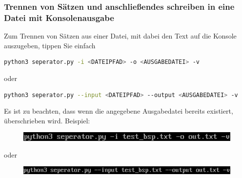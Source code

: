 \documentclass[12pt]{scrartcl}
\begin{document}
\subsubsection{Trennen von Sätzen und anschließendes schreiben in eine Datei mit Konsolenausgabe}
\label{sec:first-steps-extraction-file-with}
Zum Trennen von Sätzen aus einer Datei, mit dabei den Text auf die Konsole auszugeben, tippen Sie einfach
\begin{lstlisting}[language=bash]
python3 seperator.py -i <DATEIPFAD> -o <AUSGABEDATEI> -v
\end{lstlisting}
\begin{center}
oder
\end{center}
\begin{lstlisting}[language=bash] 
python3 seperator.py --input <DATEIPFAD> --output <AUSGABEDATEI> -v
\end{lstlisting}
Es ist zu beachten, dass wenn die angegebene Ausgabedatei bereits existiert, überschrieben wird. 
Beispiel:
\begin{figure}[htbp]
\includegraphics[width=1.0\textwidth]{ersteSchrittSaetzeTrennenFileWithConsole001}\par\vspace{0.25cm}
\label{fig:ersteSchrittSaetzeTrennenFileWithConsole001}
\end{figure}
\begin{center}
oder
\end{center}
\begin{figure}[htbp]
\includegraphics[width=1.0\textwidth]{ersteSchrittSaetzeTrennenFileWithConsole002}\par

\vspace{0.25cm}
\label{fig:ersteSchrittSaetzeTrennenFileWithConsole002}
\end{figure}
\begin{figure}[htbp]
\centering
\end{figure}
\newpage
\end{document}
